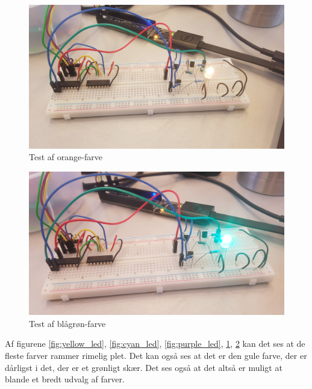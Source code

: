 \documentclass[Modultest/Modultest_main.tex]{subfiles}
\begin{document}
\begin{figure}[H]
    \centering
    \includegraphics[width=\textwidth]{Modultest/CupLight/graphics/color_test4.jpg}
    \caption{Test af orange-farve}
    \label{fig:orange_led}
\end{figure}

\begin{figure}[H]
    \centering
    \includegraphics[width=\textwidth]{Modultest/CupLight/graphics/color_test5.jpg}
    \caption{Test af blågrøn-farve}
    \label{fig:bluegreen_led}
\end{figure}

Af figurene \ref{fig:yellow_led}, \ref{fig:cyan_led}, \ref{fig:purple_led}, \ref{fig:orange_led}, \ref{fig:bluegreen_led} kan det ses at de fleste farver rammer rimelig plet. Det kan også ses at det er den gule farve, der er dårligst i det, der er et grønligt skær. Det ses også at det altså er muligt at blande et bredt udvalg af farver. 
\end{document}

